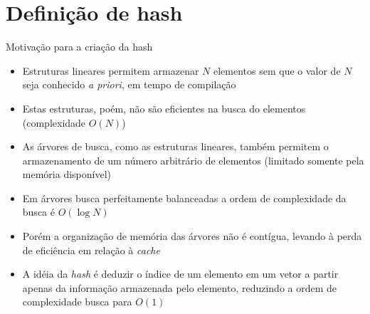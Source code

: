 \section{Definição de hash}

\begin{frame}[fragile]{Motivação para a criação da {hash}}

	\begin{itemize}
		\item Estruturas lineares permitem armazenar $N$ elementos sem que o valor de $N$
		seja conhecido \textit{a priori}, em tempo de compilação

        \item Estas estruturas, poém, não são eficientes na busca do elementos (complexidade $O(N)$)

        \item As árvores de busca, como as estruturas lineares, também permitem o armazenamento 
            de um número arbitrário de elementos (limitado somente pela memória disponível)

		\item Em árvores busca perfeitamente balanceadas a ordem de complexidade da busca 
		    é $O(\log N)$

        \item Porém a organização de memória das árvores não é contígua, levando à perda de
            eficiência em relação à \textit{cache}
 
		\item A idéia da \textit{hash} é deduzir o índice de um elemento em um vetor a partir 
            apenas da informação armazenada pelo elemento, reduzindo a ordem de complexidade busca 
            para $O(1)$
	\end{itemize}

\end{frame}


